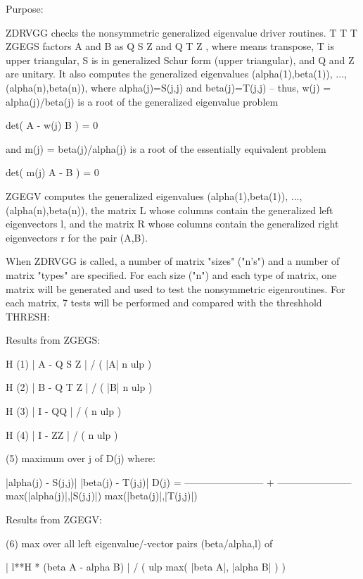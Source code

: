 \begin{DoxyParagraph}{Purpose\+: }
\begin{DoxyVerb} ZDRVGG  checks the nonsymmetric generalized eigenvalue driver
 routines.
                               T          T        T
 ZGEGS factors A and B as Q S Z  and Q T Z , where   means
 transpose, T is upper triangular, S is in generalized Schur form
 (upper triangular), and Q and Z are unitary.  It also
 computes the generalized eigenvalues (alpha(1),beta(1)), ...,
 (alpha(n),beta(n)), where alpha(j)=S(j,j) and beta(j)=T(j,j) --
 thus, w(j) = alpha(j)/beta(j) is a root of the generalized
 eigenvalue problem

     det( A - w(j) B ) = 0

 and m(j) = beta(j)/alpha(j) is a root of the essentially equivalent
 problem

     det( m(j) A - B ) = 0

 ZGEGV computes the generalized eigenvalues (alpha(1),beta(1)), ...,
 (alpha(n),beta(n)), the matrix L whose columns contain the
 generalized left eigenvectors l, and the matrix R whose columns
 contain the generalized right eigenvectors r for the pair (A,B).

 When ZDRVGG is called, a number of matrix "sizes" ("n's") and a
 number of matrix "types" are specified.  For each size ("n")
 and each type of matrix, one matrix will be generated and used
 to test the nonsymmetric eigenroutines.  For each matrix, 7
 tests will be performed and compared with the threshhold THRESH:

 Results from ZGEGS:

                  H
 (1)   | A - Q S Z  | / ( |A| n ulp )

                  H
 (2)   | B - Q T Z  | / ( |B| n ulp )

               H
 (3)   | I - QQ  | / ( n ulp )

               H
 (4)   | I - ZZ  | / ( n ulp )

 (5)   maximum over j of D(j)  where:

                     |alpha(j) - S(j,j)|        |beta(j) - T(j,j)|
           D(j) = ------------------------ + -----------------------
                  max(|alpha(j)|,|S(j,j)|)   max(|beta(j)|,|T(j,j)|)

 Results from ZGEGV:

 (6)   max over all left eigenvalue/-vector pairs (beta/alpha,l) of

    | l**H * (beta A - alpha B) | / ( ulp max( |beta A|, |alpha B| ) )


\end{DoxyVerb}
\end{DoxyParagraph}
